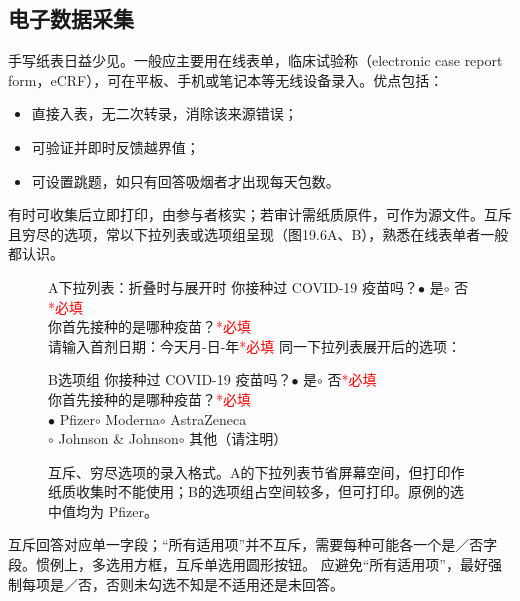 \subsection{电子数据采集}
手写纸表日益少见。一般应主要用在线表单，临床试验称（electronic case report form，eCRF），可在平板、手机或笔记本等无线设备录入。优点包括：
\begin{itemize}
\item 直接入表，无二次转录，消除该来源错误；
\item 可验证并即时反馈越界值；
\item 可设置跳题，如只有回答吸烟者才出现每天包数。
\end{itemize}
有时可收集后立即打印，由参与者核实；若审计需纸质原件，可作为源文件。互斥且穷尽的选项，常以下拉列表或选项组呈现（图19.6A、B），熟悉在线表单者一般都认识。
\begin{figure}[htbp]\centering\small
\begin{bookbox}{A\quad 下拉列表：折叠时与展开时}
你接种过 COVID-19 疫苗吗？\quad $\bullet$ 是\quad $\circ$ 否\qquad\textcolor{red}{*必填}\\
你首先接种的是哪种疫苗？\quad {}\qquad\textcolor{red}{*必填}\\
请输入首剂日期：\quad\fbox{\hspace{2cm}}\quad 今天\quad 月-日-年\qquad\textcolor{red}{*必填}
\tcblower
同一下拉列表展开后的选项：\\
\end{bookbox}
\begin{bookbox}{B\quad 选项组}
你接种过 COVID-19 疫苗吗？\quad $\bullet$ 是\quad $\circ$ 否\qquad\textcolor{red}{*必填}\\
你首先接种的是哪种疫苗？\qquad\textcolor{red}{*必填}\\
$\bullet$ Pfizer\quad $\circ$ Moderna\quad $\circ$ AstraZeneca\\
$\circ$ Johnson \& Johnson\quad $\circ$ 其他（请注明）
\end{bookbox}
\caption{互斥、穷尽选项的录入格式。A的下拉列表节省屏幕空间，但打印作纸质收集时不能使用；B的选项组占空间较多，但可打印。原例的选中值均为 Pfizer。}
\end{figure}
互斥回答对应单一字段；“所有适用项”并不互斥，需要每种可能各一个是／否字段。惯例上，多选用方框，互斥单选用圆形按钮。
应避免“所有适用项”，最好强制每项是／否，否则未勾选不知是不适用还是未回答。

